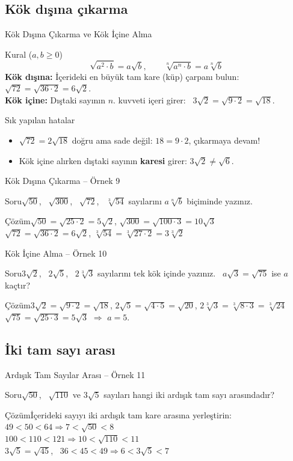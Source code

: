 \documentclass[aspectratio=169,11pt]{beamer}
\newcommand{\soru}[3]{%
\begin{frame}{#1}
  \begin{block}{Soru}\large #2\end{block}
  \pause
  \begin{exampleblock}{Çözüm}\large #3\end{exampleblock}
\end{frame}}
\begin{document}
\subsection{Kök dışına çıkarma}
\begin{frame}{Kök Dışına Çıkarma ve Kök İçine Alma}
\begin{block}{Kural (\(a,b\ge 0\))}
\[\sqrt{a^2\cdot b}=a\sqrt{b},\qquad \sqrt[n]{a^n\cdot b}=a\sqrt[n]{b}\]
\textbf{Kök dışına:} İçerideki en büyük tam kare (küp) çarpanı bulun: \ \(\sqrt{72}=\sqrt{36\cdot 2}=6\sqrt2\).\\[3pt]
\textbf{Kök içine:} Dıştaki sayının \(n\). kuvveti içeri girer: \ \(3\sqrt2=\sqrt{9\cdot 2}=\sqrt{18}\).
\end{block}
\begin{alertblock}{Sık yapılan hatalar}
\begin{itemize}
\item \(\sqrt{72}=2\sqrt{18}\) doğru ama sade değil: \(18=9\cdot 2\), çıkarmaya devam!
\item Kök içine alırken dıştaki sayının \textbf{karesi} girer: \(3\sqrt2\neq\sqrt6\).
\end{itemize}
\end{alertblock}
\end{frame}

\soru{Kök Dışına Çıkarma -- Örnek 9}
{\(\sqrt{50}\), \ \(\sqrt{300}\), \ \(\sqrt{72}\), \ \(\sqrt[3]{54}\) sayılarını \(a\sqrt[n]{b}\) biçiminde yazınız.}
{\(\sqrt{50}=\sqrt{25\cdot 2}=5\sqrt2\), \qquad \(\sqrt{300}=\sqrt{100\cdot 3}=10\sqrt3\)\\[4pt]
\(\sqrt{72}=\sqrt{36\cdot 2}=6\sqrt2\), \qquad \(\sqrt[3]{54}=\sqrt[3]{27\cdot 2}=3\sqrt[3]{2}\)}

\soru{Kök İçine Alma -- Örnek 10}
{\(3\sqrt2\), \ \(2\sqrt5\), \ \(2\sqrt[3]{3}\) sayılarını tek kök içinde yazınız. \ \(a\sqrt3=\sqrt{75}\) ise \(a\) kaçtır?}
{\(3\sqrt2=\sqrt{9\cdot 2}=\sqrt{18}\), \quad \(2\sqrt5=\sqrt{4\cdot 5}=\sqrt{20}\), \quad \(2\sqrt[3]{3}=\sqrt[3]{8\cdot 3}=\sqrt[3]{24}\)\\[4pt]
\(\sqrt{75}=\sqrt{25\cdot 3}=5\sqrt3\) \(\Rightarrow\) \(a=5\).}

\subsection{İki tam sayı arası}
\soru{Ardışık Tam Sayılar Arası -- Örnek 11}
{\(\sqrt{50}\), \ \(\sqrt{110}\) ve \(3\sqrt5\) sayıları hangi iki ardışık tam sayı arasındadır?}
{İçerideki sayıyı iki ardışık tam kare arasına yerleştirin:\\[3pt]
\(49<50<64\Rightarrow 7<\sqrt{50}<8\)\\[3pt]
\(100<110<121\Rightarrow 10<\sqrt{110}<11\)\\[3pt]
\(3\sqrt5=\sqrt{45}\), \ \(36<45<49\Rightarrow 6<3\sqrt5<7\)}
\end{document}
